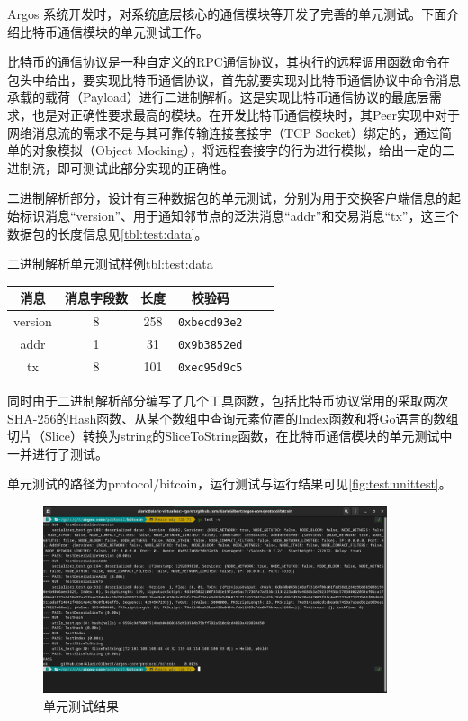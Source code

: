 \documentclass[supercite]{HustGraduPaper}
\newcommand{\xfig}[3]{
  \begin{figure}[htb]
    \centering
    #3
    \caption{#2}
    \label{fig:#1}
  \end{figure}
}
\newcommand{\rfig}[1]{\autoref{fig:#1}}
\newcommand{\rtbl}[1]{\autoref{tbl:#1}}
\theoremstyle{definition}
\begin{document}
Argos 系统开发时，对系统底层核心的通信模块等开发了完善的单元测试。下面介绍比特币通信模块的单元测试工作。

比特币的通信协议是一种自定义的RPC通信协议，其执行的远程调用函数命令在包头中给出，要实现比特币通信协议，首先就要实现对比特币通信协议中命令消息承载的载荷（Payload）进行二进制解析。这是实现比特币通信协议的最底层需求，也是对正确性要求最高的模块。在开发比特币通信模块时，其Peer实现中对于网络消息流的需求不是与其可靠传输连接套接字（TCP Socket）绑定的，通过简单的对象模拟（Object Mocking），将远程套接字的行为进行模拟，给出一定的二进制流，即可测试此部分实现的正确性。

二进制解析部分，设计有三种数据包的单元测试，分别为用于交换客户端信息的起始标识消息“version”、用于通知邻节点的泛洪消息“addr”和交易消息“tx”，这三个数据包的长度信息见\rtbl{test:data}。


\begin{generaltab}{二进制解析单元测试样例}{tbl:test:data}
  \begin{tabular}{c|ccccc}
    \toprule
    消息       & 消息字段数 & 长度       & 校验码\\
    \midrule
    version   & 8&	258	&\texttt{0xbecd93e2}  \\
    addr      & 1&	31&	\texttt{0x9b3852ed} \\
    tx        & 8&	101&	\texttt{0xec95d9c5}\\
    \bottomrule
  \end{tabular}
\end{generaltab}

同时由于二进制解析部分编写了几个工具函数，包括比特币协议常用的采取两次SHA-256的Hash函数、从某个数组中查询元素位置的Index函数和将Go语言的数组切片（Slice）转换为string的SliceToString函数，在比特币通信模块的单元测试中一并进行了测试。

单元测试的路径为protocol/bitcoin，运行测试与运行结果可见\rfig{test:unittest}。

\xfig{test:unittest}{单元测试结果}{
  \includegraphics[width=0.9\textwidth]{images/5.1-unittest.png}
}
\end{document}
